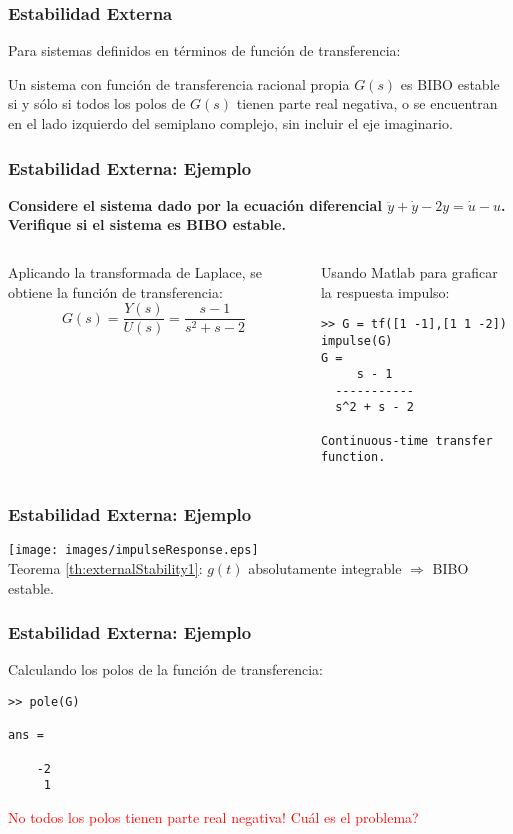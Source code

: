 \documentclass[aspectratio=169]{beamer}
\theoremstyle{definition}
\theoremstyle{plain}
\theoremstyle{remark}
\begin{document}
\begin{frame}[<-+>]\frametitle{Estabilidad Externa}
	Para sistemas definidos en términos de función de transferencia:
  \begin{theorem}\label{th:externalStability2}
    Un sistema con función de transferencia racional propia $G(s)$ es BIBO estable si y sólo si todos los polos de $G(s)$ tienen parte real negativa, o se encuentran en el lado izquierdo del semiplano complejo, sin incluir el eje imaginario.
  \end{theorem}
\end{frame}

\begin{frame}[<+->][fragile]\frametitle{Estabilidad Externa: Ejemplo}
\textbf{Considere el sistema dado por la ecuación diferencial $\ddot{y} + \dot{y} - 2y = \dot{u} - u$. Verifique si el sistema es BIBO estable.}\\
\small \pause
\begin{columns}
\begin{column}{0.5\textwidth}
Aplicando la transformada de Laplace, se obtiene la función de transferencia:
\begin{equation*}
	G(s) = \frac{Y(s)}{U(s)} = \frac{s-1}{s^2+s-2}
\end{equation*}
\pause
\end{column}	
\begin{column}{0.5\textwidth}
Usando Matlab para graficar la respuesta impulso:
\begin{verbatim}
>> G = tf([1 -1],[1 1 -2])
impulse(G)
G =
     s - 1
  -----------
  s^2 + s - 2
 
Continuous-time transfer function.
\end{verbatim}
\end{column}	
\end{columns}
\end{frame}

\begin{frame}[<+->][fragile]\frametitle{Estabilidad Externa: Ejemplo}
\centering
\texttt{[image: images/impulseResponse.eps]}\\
\small \pause
Teorema \ref{th:externalStability1}: $g(t)$ absolutamente integrable $\Rightarrow$ BIBO estable.
\end{frame}

\begin{frame}[<+->][fragile]\frametitle{Estabilidad Externa: Ejemplo}
Calculando los polos de la función de transferencia:
\begin{verbatim}
>> pole(G)

ans =

    -2
     1
\end{verbatim}
\pause
\textcolor{red}{No todos los polos tienen parte real negativa! Cuál es el problema?}
\end{frame}
\end{document}
